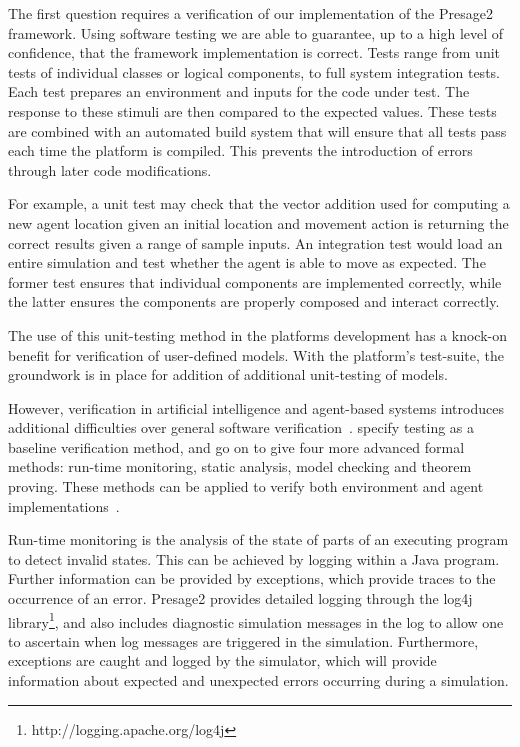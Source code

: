 The first question requires a verification of our implementation of the Presage2
framework. Using software testing we are able to guarantee, up to a high level of
confidence, that the framework implementation is correct. Tests range from unit
tests of individual classes or logical components, to full system integration
tests. Each test prepares an environment and inputs for the code under test. The
response to these stimuli are then compared to the expected values. These tests
are combined with an automated build system that will ensure that all tests pass
each time the platform is compiled. This prevents the introduction of errors
through later code modifications.

For example, a unit test may check that the vector addition used for computing
a new agent location given an initial location and movement action is
returning the correct results given a range of sample inputs. An integration
test would load an entire simulation and test whether the agent is able to
move as expected. The former test ensures that individual components are
implemented correctly, while the latter ensures the components are properly
composed and interact correctly.

The use of this unit-testing method in the platforms development has a knock-on
benefit for verification of user-defined models. With the platform's test-suite,
the groundwork is in place for addition of additional unit-testing of models.

However, verification in artificial intelligence and agent-based systems
introduces additional difficulties over general software
verification~\citep{Wooldridge1998}. \citet{Menzies2005} specify testing as a
baseline verification method, and go on to give four more advanced formal
methods: run-time monitoring, static analysis, model checking and theorem
proving. These methods can be applied to verify both environment and agent
implementations~\citep{Sudeikat2007a}.

Run-time monitoring is the analysis of the state of parts of an executing
program to detect invalid states. This can be achieved by logging within a
Java program. Further information can be provided by exceptions, which provide
traces to the occurrence of an error. Presage2 provides detailed logging through
the log4j library\footnote{http://logging.apache.org/log4j}, and also includes diagnostic simulation messages in the log
to allow one to ascertain when log messages are triggered in the simulation.
Furthermore, exceptions are caught and logged by the simulator, which will
provide information about expected and unexpected errors occurring during a
simulation.

